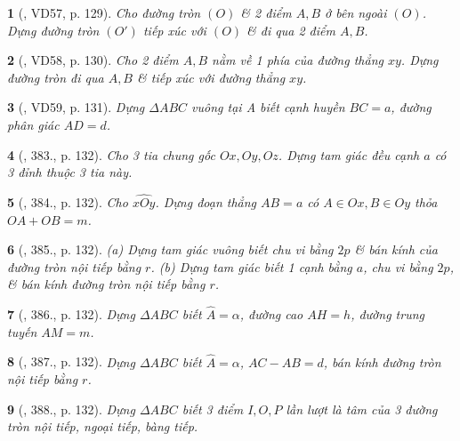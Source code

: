 \documentclass{article}
\newtheorem{baitoan}{}
\begin{document}
\begin{baitoan}[\cite{Binh_Toan_9_tap_2}, VD57, p. 129]
	Cho đường tròn $(O)$ \& 2 điểm $A,B$ ở bên ngoài $(O)$. Dựng đường tròn $(O')$ tiếp xúc với $(O)$ \& đi qua 2 điểm $A,B$.
\end{baitoan}

\begin{baitoan}[\cite{Binh_Toan_9_tap_2}, VD58, p. 130]
	Cho 2 điểm $A,B$ nằm về 1 phía của đường thẳng $xy$. Dựng đường tròn đi qua $A,B$ \& tiếp xúc với đường thẳng $xy$.
\end{baitoan}
\begin{baitoan}[\cite{Binh_Toan_9_tap_2}, VD59, p. 131]
	Dựng $\Delta ABC$ vuông tại A biết cạnh huyền $BC = a$, đường phân giác $AD = d$.
\end{baitoan}

\begin{baitoan}[\cite{Binh_Toan_9_tap_2}, 383., p. 132]
	Cho 3 tia chung gốc $Ox,Oy,Oz$. Dựng tam giác đều cạnh $a$ có 3 đỉnh thuộc 3 tia này.
\end{baitoan}

\begin{baitoan}[\cite{Binh_Toan_9_tap_2}, 384., p. 132]
	Cho $\widehat{xOy}$. Dựng đoạn thẳng $AB = a$ có $A\in Ox,B\in Oy$ thỏa $OA + OB = m$.
\end{baitoan}

\begin{baitoan}[\cite{Binh_Toan_9_tap_2}, 385., p. 132]
	(a) Dựng tam giác vuông biết chu vi bằng $2p$ \& bán kính của đường tròn nội tiếp bằng $r$. (b) Dựng tam giác biết 1 cạnh bằng $a$, chu vi bằng $2p$, \& bán kính đường tròn nội tiếp bằng $r$.
\end{baitoan}

\begin{baitoan}[\cite{Binh_Toan_9_tap_2}, 386., p. 132]
	Dựng $\Delta ABC$ biết $\widehat{A} = \alpha$, đường cao $AH = h$, đường trung tuyến $AM = m$.
\end{baitoan}

\begin{baitoan}[\cite{Binh_Toan_9_tap_2}, 387., p. 132]
	Dựng $\Delta ABC$ biết $\widehat{A} = \alpha$, $AC - AB = d$, bán kính đường tròn nội tiếp bằng $r$.
\end{baitoan}

\begin{baitoan}[\cite{Binh_Toan_9_tap_2}, 388., p. 132]
	Dựng $\Delta ABC$ biết 3 điểm $I,O,P$ lần lượt là tâm của 3 đường tròn nội tiếp, ngoại tiếp, bàng tiếp.
\end{baitoan}
\end{document}
